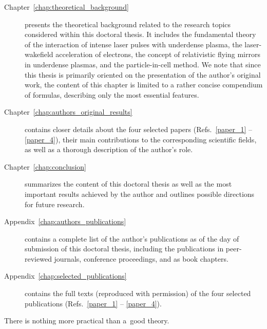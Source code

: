 \documentclass[10pt, a4paper, twoside, openright]{report}
\begin{document}
\begin{description}
	\item[Chapter~\ref{chap:theoretical_background}] presents the theoretical background related to the research topics considered within this doctoral thesis. It includes the fundamental theory of the interaction of intense laser pulses with underdense plasma, the laser-wakefield acceleration of electrons, the concept of relativistic flying mirrors in underdense plasmas, and the particle-in-cell method. We note that since this thesis is primarily oriented on the presentation of the author's original work, the content of this chapter is limited to a rather concise compendium of formulas, describing only the most essential features. 
	
	\item[Chapter~\ref{chap:authors_original_results}] contains closer details about the four selected papers (Refs.~\ref{paper_1} -- \ref{paper_4}), their main contributions to the corresponding scientific fields, as well as a thorough description of the author's role. 
	
	\item[Chapter~\ref{chap:conclusion}] summarizes the content of this doctoral thesis as well as the most important results achieved by the author and outlines possible directions for future research. 
	
	\item[Appendix~\ref{chap:authors_publications}] contains a complete list of the author's publications as of the day of submission of this doctoral thesis, including the publications in peer-reviewed journals, conference proceedings, and as book chapters.
	
	\item[Appendix~\ref{chap:selected_publications}] contains the full texts (reproduced with permission) of the four selected publications (Refs.~\ref{paper_1} -- \ref{paper_4}).
	
\end{description}
	

\begin{savequote}[0.45\linewidth]
	\begin{fquote}
		 There is nothing more practical than a~good theory.
	\end{fquote}
\end{savequote}
\end{document}
